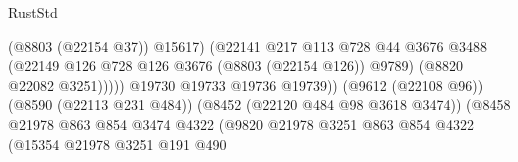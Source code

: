 \begin{lexlean}{RustStd}
\begin{coremodule}
                                                            (@8803 (@22154 @37))
                                                            @15617)
                                                          (@22141
                                                            @217
                                                            @113
                                                            @728
                                                            @44
                                                            @3676
                                                            @3488
                                                            (@22149
                                                              @126
                                                              @728
                                                              @126
                                                              @3676
                                                              (@8803 (@22154 @126))
                                                              @9789)
                                                            (@8820 @22082 @3251)))))
                                                    @19730
                                                    @19733
                                                    @19736
                                                    @19739))
                                                (@9612 (@22108 @96))
                                                (@8590 (@22113 @231 @484))
                                                (@8452 (@22120 @484 @98 @3618 @3474))
                                                (@8458
                                                  @21978
                                                  @863
                                                  @854
                                                  @3474
                                                  @4322
                                                  (@9820
                                                    @21978
                                                    @3251
                                                    @863
                                                    @854
                                                    @4322
                                                    (@15354
                                                      @21978
                                                      @3251
                                                      @191
                                                      @490

\end{coremodule}
\end{lexlean}
